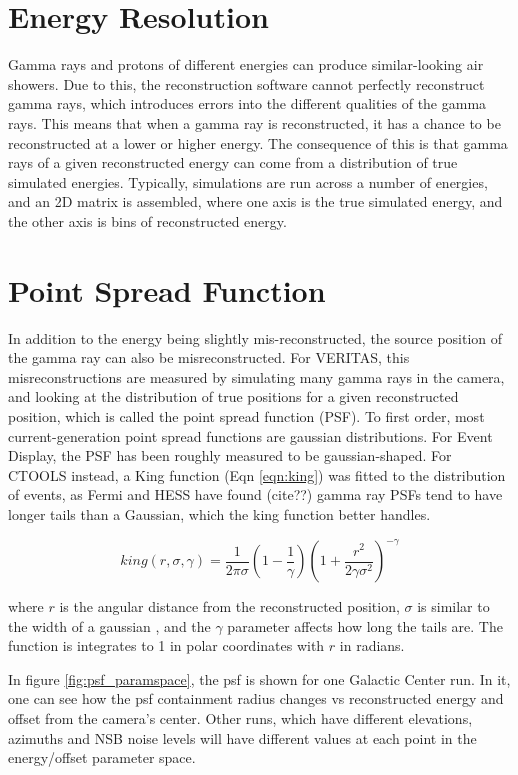 \section{Energy Resolution}
Gamma rays and protons of different energies can produce similar-looking air showers.
Due to this, the reconstruction software cannot perfectly reconstruct gamma rays, which introduces errors into the different qualities of the gamma rays.
This means that when a gamma ray is reconstructed, it has a chance to be reconstructed at a lower or higher energy.
The consequence of this is that gamma rays of a given reconstructed energy can come from a distribution of true simulated energies.
Typically, simulations are run across a number of energies, and an 2D matrix is assembled, where one axis is the true simulated energy, and the other axis is bins of reconstructed energy.

\section{Point Spread Function}\label{sec:psf}
In addition to the energy being slightly mis-reconstructed, the source position of the gamma ray can also be misreconstructed.
For VERITAS, this misreconstructions are measured by simulating many gamma rays in the camera, and looking at the distribution of true positions for a given reconstructed position, which is called the point spread function (PSF).
To first order, most current-generation point spread functions are gaussian distributions.
For Event Display, the PSF has been roughly measured to be gaussian-shaped.
For CTOOLS instead, a King function (Eqn \ref{eqn:king}) was fitted to the distribution of events, as Fermi and HESS have found (cite??) gamma ray PSFs tend to have longer tails than a Gaussian, which the king function better handles.

\begin{equation} \label{eqn:king}
king\left(r,\sigma,\gamma \right )=\frac{1}{2\pi\sigma}\left (1-\frac{1}{\gamma} \right )\left(1+\frac{r^2}{2\gamma\sigma^2} \right )^{-\gamma}
\end{equation}

where $r$ is the angular distance from the reconstructed position, $\sigma$ is similar to the width of a gaussian , and the $\gamma$ parameter affects how long the tails are.
The function is integrates to 1 in polar coordinates with $r$ in radians.

In figure \ref{fig:psf_paramspace}, the psf is shown for one Galactic Center run.
In it, one can see how the psf containment radius changes vs reconstructed energy and offset from the camera's center.
Other runs, which have different elevations, azimuths and NSB noise levels will have different values at each point in the energy/offset parameter space.

